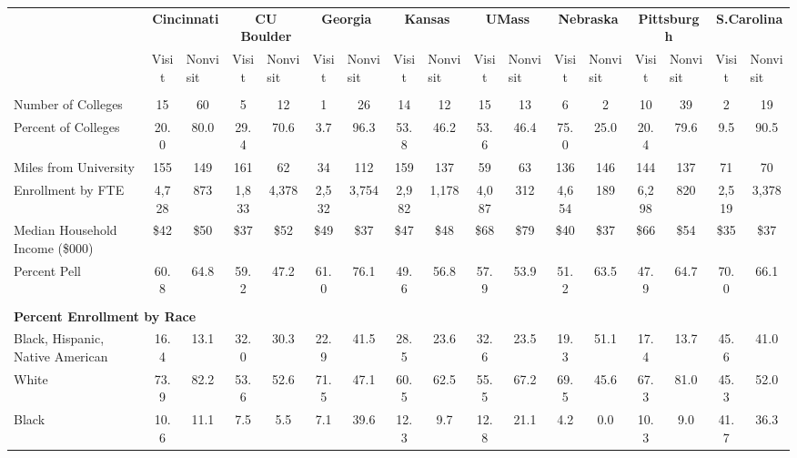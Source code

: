 \begin{tabular*}{\linewidth}{@{\extracolsep{\fill} } lcccccccccccccccc}%
&\multicolumn{2}{c}{\bfseries Cincinnati}&\multicolumn{2}{c}{\bfseries CU Boulder}&\multicolumn{2}{c}{\bfseries Georgia}&\multicolumn{2}{c}{\bfseries Kansas}&\multicolumn{2}{c}{\bfseries UMass}&\multicolumn{2}{c}{\bfseries Nebraska}&\multicolumn{2}{c}{\bfseries Pittsburgh}&\multicolumn{2}{c}{\bfseries S.Carolina}\\%
&Visit&\multicolumn{1}{l}{Nonvisit}&Visit&\multicolumn{1}{l}{Nonvisit}&Visit&\multicolumn{1}{l}{Nonvisit}&Visit&\multicolumn{1}{l}{Nonvisit}&Visit&\multicolumn{1}{l}{Nonvisit}&Visit&\multicolumn{1}{l}{Nonvisit}&Visit&\multicolumn{1}{l}{Nonvisit}&Visit&\multicolumn{1}{l}{Nonvisit}\\%
\hline%
&&&&&&&&&&&&&&&&\\%
\hspace{0cm}Number of Colleges&15&60&5&12&1&26&14&12&15&13&6&2&10&39&2&19\\%
Percent of Colleges&20.0&80.0&29.4&70.6&3.7&96.3&53.8&46.2&53.6&46.4&75.0&25.0&20.4&79.6&9.5&90.5\\%
\hspace{0cm}Miles from University&155&149&161&62&34&112&159&137&59&63&136&146&144&137&71&70\\%
\hspace{0cm}Enrollment by FTE&4,728&873&1,833&4,378&2,532&3,754&2,982&1,178&4,087&312&4,654&189&6,298&820&2,519&3,378\\%
\hspace{0cm}Median Household Income (\$000)&\$42&\$50&\$37&\$52&\$49&\$37&\$47&\$48&\$68&\$79&\$40&\$37&\$66&\$54&\$35&\$37\\%
\hspace{0cm}Percent Pell&60.8&64.8&59.2&47.2&61.0&76.1&49.6&56.8&57.9&53.9&51.2&63.5&47.9&64.7&70.0&66.1\\%
&&&&&&&&&&&&&&&&\\%
\multicolumn{17}{l}{\bfseries Percent Enrollment by Race}\\%
\hspace{0.2cm}Black, Hispanic, Native American&16.4&13.1&32.0&30.3&22.9&41.5&28.5&23.6&32.6&23.5&19.3&51.1&17.4&13.7&45.6&41.0\\%
\hspace{0.2cm}White&73.9&82.2&53.6&52.6&71.5&47.1&60.5&62.5&55.5&67.2&69.5&45.6&67.3&81.0&45.3&52.0\\%
\hspace{0.2cm}Black&10.6&11.1&7.5&5.5&7.1&39.6&12.3&9.7&12.8&21.1&4.2&0.0&10.3&9.0&41.7&36.3\\%

\end{tabular*}

